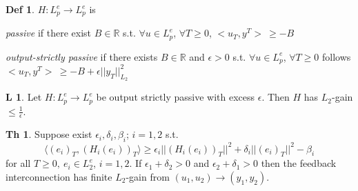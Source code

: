 \documentclass[9pt,landscape]{article}
\theoremstyle{definition}
\newtheorem*{Theorem}{Th}
\newtheorem*{Lemma}{L}
\newtheorem*{Definition}{Def}
\begin{document}
\begin{multicols}{4}
\begin{Definition}
 $H:L_p^e\rightarrow L_p^e$ is

 {\it passive} if there exist $B\in\mathbb{R}$ s.t. $\forall u\in L_p^e$, $\forall T\ge0$,
 $<u_T,y^T>\ \ge -B$

 {\it output-strictly passive} if there exists $B\in\mathbb{R}$ and $\epsilon>0$ s.t.
 $\forall u\in L_p^e$, $\forall T\ge0$ follows  $<u_T,y^T>\ \ge -B+\epsilon ||y_T||_{L_2}^2$
\end{Definition}

\begin{Lemma}
 Let $H:L_p^e\rightarrow L_p^e$ be output strictly passive with excess $\epsilon$. Then $H$
 has $L_2$-gain $\le\frac{1}{\epsilon}$.
\end{Lemma}

\begin{Theorem}
 Suppose exist $\epsilon_i, \delta_i, \beta_i$; $i=1,2$ s.t.
 $$\langle(e_i)_T, (H_i(e_i))_T\rangle \ge \epsilon_i ||(H_i(e_i))_T||^2+\delta_i
 ||(e_i)_T||^2-\beta_i$$
 for all $T\ge0, \ e_i\in L_2^e$, $i=1,2$. If $\epsilon_1+\delta_2>0$ and $\epsilon_2+\delta_1>0$
 then the feedback interconnection has finite $L_2$-gain from $(u_1,u_2)\rightarrow(y_1,y_2)$.
\end{Theorem}

\end{multicols}
\end{document}
